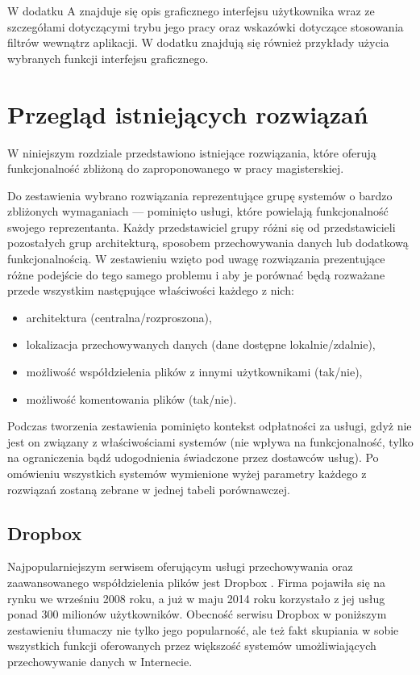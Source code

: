 \documentclass[polish,a4paper,twoside]{ppfcmthesis}
\begin{document}
W dodatku A znajduje się opis graficznego interfejsu użytkownika wraz ze szczegółami dotyczącymi trybu jego pracy oraz wskazówki dotyczące stosowania filtrów wewnątrz aplikacji. W dodatku znajdują się również przykłady użycia wybranych funkcji interfejsu graficznego.

\chapter{Przegląd istniejących rozwiązań}

W niniejszym rozdziale przedstawiono istniejące rozwiązania, które oferują funkcjonalność zbliżoną do zaproponowanego w pracy magisterskiej.

Do zestawienia wybrano rozwiązania reprezentujące grupę systemów o bardzo zbliżonych wymaganiach --- pominięto usługi, które powielają funkcjonalność swojego reprezentanta. Każdy przedstawiciel grupy różni się od przedstawicieli pozostałych grup architekturą, sposobem przechowywania danych lub dodatkową funkcjonalnością. W zestawieniu wzięto pod uwagę rozwiązania prezentujące różne podejście do tego samego problemu i aby je porównać będą rozważane przede wszystkim następujące właściwości każdego z nich:

\begin{itemize}[noitemsep]
  \item architektura (centralna/rozproszona),
  \item lokalizacja przechowywanych danych (dane dostępne lokalnie/zdalnie),
  \item możliwość współdzielenia plików z innymi użytkownikami (tak/nie),
  \item możliwość komentowania plików (tak/nie).
\end{itemize}

Podczas tworzenia zestawienia pominięto kontekst odpłatności za usługi, gdyż nie jest on związany z właściwościami systemów (nie wpływa na funkcjonalność, tylko na ograniczenia bądź udogodnienia świadczone przez dostawców usług). Po omówieniu wszystkich systemów wymienione wyżej parametry każdego z rozwiązań zostaną zebrane w jednej tabeli porównawczej.

\section*{Dropbox}

Najpopularniejszym serwisem oferującym usługi przechowywania oraz zaawansowanego współdzielenia plików jest Dropbox \cite{dropbox}. Firma pojawiła się na rynku we wrześniu 2008 roku, a już w maju 2014 roku korzystało z jej usług ponad 300 milionów użytkowników. Obecność serwisu Dropbox w poniższym zestawieniu tłumaczy nie tylko jego popularność, ale też fakt skupiania w sobie wszystkich funkcji oferowanych przez większość systemów umożliwiających przechowywanie danych w Internecie.
\end{document}
